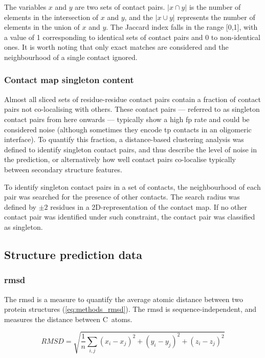 The variables $x$ and $y$ are two sets of contact pairs. $\left |x \cap y\right |$ is the number of elements in the intersection of $x$ and $y$, and the $\left |x \cup y\right |$ represents the number of elements in the union of $x$ and $y$. The Jaccard index falls in the range [0,1], with a value of 1 corresponding to identical sets of contact pairs and 0 to non-identical ones. It is worth noting that only exact matches are considered and the neighbourhood of a single contact ignored.
\subsubsection{Contact map singleton content}
Almost all sliced sets of residue-residue contact pairs contain a fraction of contact pairs not co-localising with others. These contact pairs --- referred to as singleton contact pairs from here onwards --- typically show a high \gls{fp} rate and could be considered noise (although sometimes they encode \gls{tp} contacts in an oligomeric interface). To quantify this fraction, a distance-based clustering analysis was defined to identify singleton contact pairs, and thus describe the level of noise in the prediction, or alternatively how well contact pairs co-localise typically between secondary structure features.

To identify singleton contact pairs in a set of contacts, the neighbourhood of each pair was searched for the presence of other contacts. The search radius was defined by $\pm2$ residues in a 2D-representation of the contact map. If no other contact pair was identified under such constraint, the contact pair was classified as singleton.

\subsection{Structure prediction data}
\subsubsection{\acrlong{rmsd}}
The \gls{rmsd} is a measure to quantify the average atomic distance between two protein structures (\cref{eq:methods_rmsd}). The \gls{rmsd} is sequence-independent, and measures the distance between C\textalpha\ atoms.

\begin{equation}
RMSD=\sqrt{\frac{1}{n}\sum_{i,j}{(x_i-x_j)^2+(y_i-y_j)^2+(z_i-z_j)^2}}
\label{eq:methods_rmsd}
\end{equation}

